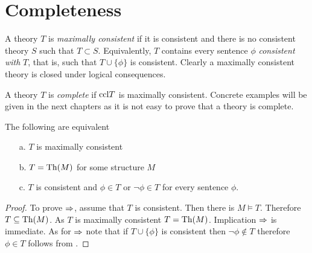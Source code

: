 % 
% 
% 


\section{Completeness}

A theory $T$ is \emph{maximally consistent\/} if it is consistent and there is no consistent theory $S$ such that $T\subset S$.
Equivalently, $T$ contains every sentence $\phi$ \emph{consistent with\/} $T$, that is, such that $T\cup\{\phi\}$ is consistent.
Clearly a maximally consistent theory is closed under logical consequences.

A theory $T$ is \emph{complete\/} if ${\rm ccl} T$ is maximally consistent.
Concrete examples will be given in the next chapters as it is not easy to prove that a theory is complete.

\begin{proposition}\label{fattoconsistenzasen4sostretto}
The following are equivalent
\begin{itemize}
\item[a.] $T$ is maximally consistent
\item[b.] $T={\rm Th}(M)$ for some structure $M$
\item[c.] $T$ is consistent and $\phi\in T$ or $\neg\phi\in T$ for every sentence $\phi$.
\end{itemize}
\end{proposition}
\begin{proof}
To prove $\Rightarrow$, assume that $T$ is consistent.
Then there is $M\models T$.
Therefore $T\subseteq{\rm Th} (M)$.
As $T$ is maximally consistent $T={\rm Th}(M)$.
Implication $\Rightarrow$ is immediate.
 As for $\Rightarrow$ note that if $T\cup\{\phi\}$ is consistent then $\neg\phi\not\in T$ therefore $\phi\in T$ follows from .
\end{proof}

